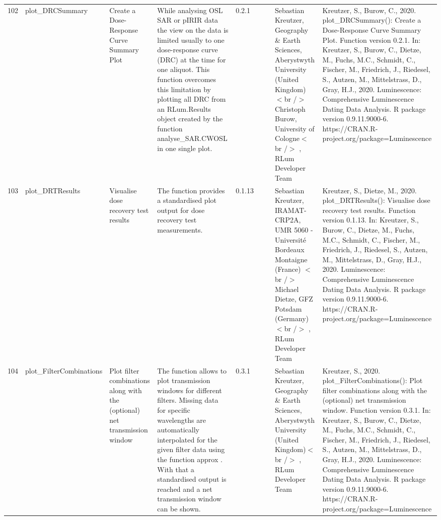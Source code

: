 \begin{table}[ht]
\begin{tabular}{rllllllll}
 \\ 
  102 & plot\_DRCSummary & Create a Dose-Response Curve Summary Plot & While analysing OSL SAR or pIRIR data the view on the data is limited usually to one dose-response curve (DRC) at the time for one aliquot. This function overcomes this limitation by plotting all DRC from an  RLum.Results  object created by the function  analyse\_SAR.CWOSL  in one single plot. & 0.2.1
 &  &  & Sebastian Kreutzer, Geography \& Earth Sciences, Aberystwyth University (United Kingdom)  $<$br /$>$ Christoph Burow, University of Cologne$<$br /$>$ , RLum Developer Team & Kreutzer, S., Burow, C., 2020. plot\_DRCSummary(): Create a Dose-Response Curve Summary Plot. Function version 0.2.1. In: Kreutzer, S., Burow, C., Dietze, M., Fuchs, M.C., Schmidt, C., Fischer, M., Friedrich, J., Riedesel, S., Autzen, M., Mittelstrass, D., Gray, H.J., 2020. Luminescence: Comprehensive Luminescence Dating Data Analysis. R package version 0.9.11.9000-6. https://CRAN.R-project.org/package=Luminescence
 \\ 
  103 & plot\_DRTResults & Visualise dose recovery test results & The function provides a standardised plot output for dose recovery test measurements. & 0.1.13
 &  &  & Sebastian Kreutzer, IRAMAT-CRP2A, UMR 5060 - Université Bordeaux Montaigne (France) $<$br /$>$ Michael Dietze, GFZ Potsdam (Germany)$<$br /$>$ , RLum Developer Team & Kreutzer, S., Dietze, M., 2020. plot\_DRTResults(): Visualise dose recovery test results. Function version 0.1.13. In: Kreutzer, S., Burow, C., Dietze, M., Fuchs, M.C., Schmidt, C., Fischer, M., Friedrich, J., Riedesel, S., Autzen, M., Mittelstrass, D., Gray, H.J., 2020. Luminescence: Comprehensive Luminescence Dating Data Analysis. R package version 0.9.11.9000-6. https://CRAN.R-project.org/package=Luminescence
 \\ 
  104 & plot\_FilterCombinations & Plot filter combinations along with the (optional) net transmission window & The function allows to plot transmission windows for different filters. Missing data for specific wavelengths are automatically interpolated for the given filter data using the function  approx . With that a standardised output is reached and a net transmission window can be shown. & 0.3.1
 &  &  & Sebastian Kreutzer, Geography \& Earth Sciences, Aberystwyth University (United Kingdom)$<$br /$>$ , RLum Developer Team & Kreutzer, S., 2020. plot\_FilterCombinations(): Plot filter combinations along with the (optional) net transmission window. Function version 0.3.1. In: Kreutzer, S., Burow, C., Dietze, M., Fuchs, M.C., Schmidt, C., Fischer, M., Friedrich, J., Riedesel, S., Autzen, M., Mittelstrass, D., Gray, H.J., 2020. Luminescence: Comprehensive Luminescence Dating Data Analysis. R package version 0.9.11.9000-6. https://CRAN.R-project.org/package=Luminescence

\end{tabular}
\end{table}
